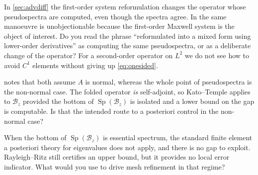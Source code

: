 \documentclass[11pt,a4paper]{article}
\theoremstyle{plain}
\newcommand{\Bop}{\mathcal{B}}
\DeclareMathOperator{\Sp}{Sp}
\begin{document}
\begin{question}
  In \cref{sec:advdiff} the first-order system reformulation changes the
  operator whose pseudospectra are computed, even though the spectra agree.  In
  \cite[\S3.4.4]{Colbrook2026} the same manoeuvre is unobjectionable because the
  first-order Maxwell system is the object of interest.  Do you read the phrase
  ``reformulated into a mixed form using lower-order derivatives''
  \cite[p.~129]{Colbrook2026} as computing the same pseudospectra, or as a
  deliberate change of the operator?  For a second-order operator on $L^2$ we do
  not see how to avoid $C^1$ elements without giving up \cref{eq:onesided}.
\end{question}

\begin{question}
   notes that \cite[Proposition~3.3.12 and
  Theorem~3.3.11]{Colbrook2026} both assume $A$ is normal, whereas the whole
  point of pseudospectra is the non-normal case.  The folded operator
  \emph{is} self-adjoint, so Kato--Temple applies to $\Bop_z$ provided the
  bottom of $\Sp(\Bop_z)$ is isolated and a lower bound on the gap is
  computable.  Is that the intended route to a posteriori control in the
  non-normal case?
\end{question}

\begin{question}
  When the bottom of $\Sp(\Bop_z)$ is essential spectrum, the standard finite
  element a posteriori theory for eigenvalues does not apply, and there is no
  gap to exploit.  Rayleigh--Ritz still certifies an upper bound, but it
  provides no local error indicator.  What would you use to drive mesh
  refinement in that regime?
\end{question}



\end{document}
